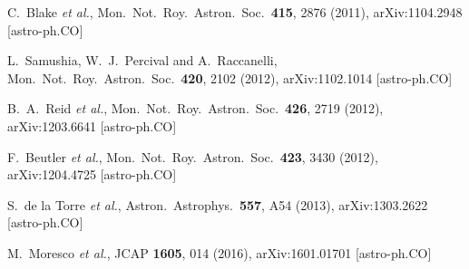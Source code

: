 \documentclass[superscriptaddress,oneolumn,secnumarabic,
amssymb,amsmath,nobibnotes,aps,prd,showpacs,nofootinbib]{revtex4}%
\begin{document}
\begin{thebibliography}{*}
  C.~Blake {\it et al.},
  Mon.\ Not.\ Roy.\ Astron.\ Soc.\  {\bf 415}, 2876 (2011),
  arXiv:1104.2948 [astro-ph.CO]

  L.~Samushia, W.~J.~Percival and A.~Raccanelli,
  Mon.\ Not.\ Roy.\ Astron.\ Soc.\  {\bf 420}, 2102 (2012),
  arXiv:1102.1014 [astro-ph.CO]



  B.~A.~Reid {\it et al.},
  Mon.\ Not.\ Roy.\ Astron.\ Soc.\  {\bf 426}, 2719 (2012),
  arXiv:1203.6641 [astro-ph.CO]


  F.~Beutler {\it et al.},
  Mon.\ Not.\ Roy.\ Astron.\ Soc.\  {\bf 423}, 3430 (2012),
  arXiv:1204.4725 [astro-ph.CO]


  S.~de la Torre {\it et al.},
  Astron.\ Astrophys.\  {\bf 557}, A54 (2013),
  arXiv:1303.2622 [astro-ph.CO]


M.~Moresco {\it et al.},
JCAP {\bf 1605}, 014 (2016),
arXiv:1601.01701 [astro-ph.CO]



\end{thebibliography}
\end{document}
